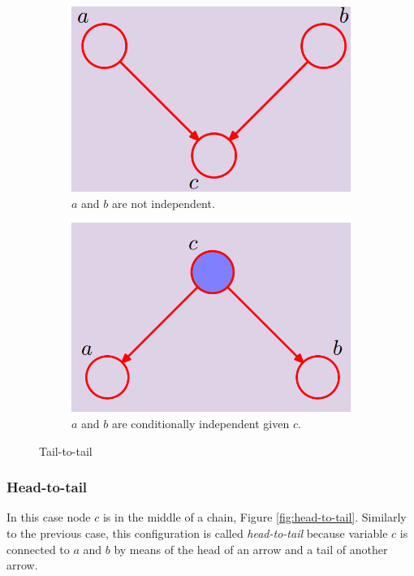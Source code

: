 \begin{figure}
\centering
\begin{subfigure}[t]{0.49\textwidth}
\centering
\includegraphics[width=\linewidth]{images/nonTrivialThreeVars.png} 
\caption{$a$ and $b$ are not independent.}
\label{fig:unSelectedTailToTail}
\end{subfigure}
\hfill
\begin{subfigure}[t]{0.49\textwidth}
\centering
\includegraphics[width=\linewidth]{images/tailtToTailSelected.png}
\caption{$a$ and $b$ are conditionally independent given $c$.}
\label{fig:selectedTailToTail}
\end{subfigure}

\caption{Tail-to-tail}
\label{fig:tail-to-tail}
\end{figure}

\subsubsection{Head-to-tail}
In this case node $c$ is in the middle of a chain, Figure \ref{fig:head-to-tail}. Similarly to the previous case, this configuration is called \textit{head-to-tail} because variable $c$ is connected to $a$ and $b$ by means of the head of an arrow and a tail of another arrow. \newline

